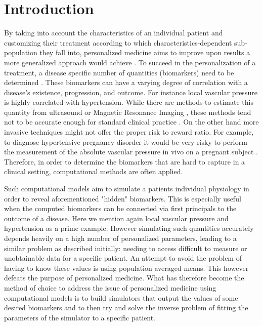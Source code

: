 \documentclass[a4paper, oneside]{discothesis}
\begin{document}
\tableofcontents

\mainmatter %

\chapter{Introduction}
By taking into account the characteristics of an individual patient and customizing their treatment according to which characteristics-dependent sub-population they fall into, personalized medicine aims to improve upon results a more generalized approach would achieve \cite{ashley2016towards,national2011toward,giardino2017role}.
To succeed in the personalization of a treatment, a disease specific number of quantities (biomarkers) need to be determined \cite{burke1998integrating}.
These biomarkers can have a varying degree of correlation with a disease's existence, progression, and outcome.
For instance local vascular pressure is highly correlated with hypertension.
While there are methods to estimate this quantity from ultrasound or Magnetic Resonance Imaging \cite{markl20124d}, these methods tend not to be accurate enough for standard clinical practice \cite{everett2012beyond}.
On the other hand more invasive techniques might not offer the proper risk to reward ratio.
For example, to diagnose hypertensive pregnancy disorder it would be very risky to perform the measurement of the absolute vascular pressure in vivo on a pregnant subject \cite{kett2002adverse}.
Therefore, in order to determine the biomarkers that are hard to capture in a clinical setting, computational methods are often applied.

Such computational models aim to simulate a patients individual physiology in order to reveal aforementioned "hidden" biomarkers.
This is especially useful when the computed biomarkers can be connected via first principals to the outcome of a disease.
Here we mention again local vascular pressure and hypertension as a prime example.
However simulating such quantities accurately depends heavily on a high number of personalized parameters, leading to a similar problem as described initially: needing to access difficult to measure or unobtainable data for a specific patient.
An attempt to avoid the problem of having to know these values is using population averaged means.
This however defeats the purpose of personalized medicine.
What has therefore become the method of choice to address the issue of personalized medicine using computational models is to build simulators that output the values of some desired biomarkers and to then try and solve the inverse problem of fitting the parameters of the simulator to a specific patient.
\end{document}
